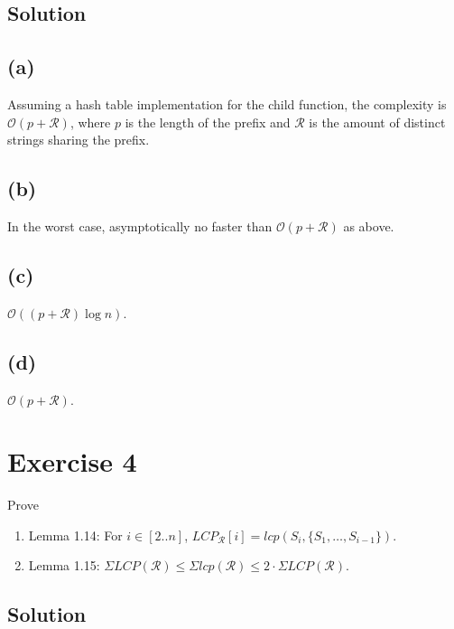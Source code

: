 \documentclass[10pt]{article}
\begin{document}
\subsection*{Solution}

\subsection*{(a)}
Assuming a hash table implementation for the child function, the complexity is $\mathcal{O}(p + \mathcal{R})$, where $p$ is the length of the prefix and $\mathcal{R}$ is the amount of distinct strings sharing the prefix.

\subsection*{(b)}
In the worst case, asymptotically no faster than $\mathcal{O}(p + \mathcal{R})$ as above.

\subsection*{(c)}
$\mathcal{O}((p + \mathcal{R}) \log n)$.

\subsection*{(d)}
$\mathcal{O}(p + \mathcal{R})$.

\section*{Exercise 4}
\color{blue}
Prove
\begin{enumerate}[label=(\alph*)]
\item Lemma 1.14: For $i \in [2..n]$, $LCP_{\mathcal{R}}[i] = lcp(S_i, \{ S_1, \dots, S_{i - 1} \})$.
\item Lemma 1.15: $\Sigma LCP(\mathcal{R}) \leq \Sigma lcp(\mathcal{R}) \leq 2 \cdot \Sigma LCP(\mathcal{R})$.
\end{enumerate}
\color{black}
\subsection*{Solution}
\end{document}
